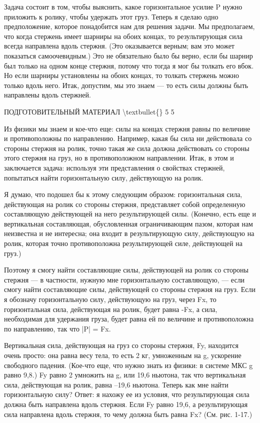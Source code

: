 \documentclass[10pt,oneside]{article}
\begin{document}
Задача состоит в том, чтобы выяснить, какое горизонтальное усилие P нужно приложить к ролику, чтобы удержать этот груз. Теперь я сделаю одно предположение, которое понадобится нам для решения задачи. Мы предполагаем, что когда стержень имеет шарниры на обоих концах, то результирующая сила всегда направлена вдоль стержня. (Это оказывается верным; вам это может показаться самоочевидным.) Это не обязательно было бы верно, если бы шарнир был только на одном конце стержня, потому что тогда я мог бы толкать его вбок. Но если шарниры установлены на обоих концах, то толкать стержень можно только вдоль него. Итак, допустим, мы это знаем --- то есть силы должны быть направлены вдоль стержней.\par

ПОДГОТОВИТЕЛЬНЫЙ МАТЕРИАЛ \textbackslash{}textbullet\{\} 5 5\par

Из физики мы знаем и кое-что еще: силы на концах стержня равны по величине и противоположны по направлению. Например, какая бы сила ни действовала со стороны стержня на ролик, точно такая же сила должна действовать со стороны этого стержня на груз, но в противоположном направлении. Итак, в этом и заключается задача: используя эти представления о свойствах стержней, попытаться найти горизонтальную силу, действующую на ролик.\par

Я думаю, что подошел бы к этому следующим образом: горизонтальная сила, действующая на ролик со стороны стержня, представляет собой определенную составляющую действующей на него результирующей силы. (Конечно, есть еще и вертикальная составляющая, обусловленная ограничивающим пазом, которая нам неизвестна и не интересна; она входит в результирующую силу, действующую на ролик, которая точно противоположна результирующей силе, действующей на груз.)\par

Поэтому я смогу найти составляющие силы, действующей на ролик со стороны стержня --- в частности, нужную мне горизонтальную составляющую, --- если смогу найти составляющие силы, действующей со стороны стержня на груз. Если я обозначу горизонтальную силу, действующую на груз, через Fx, то горизонтальная сила, действующая на ролик, будет равна -Fx, а сила, необходимая для удержания груза, будет равна ей по величине и противоположна по направлению, так что |P| = Fx.\par

Вертикальная сила, действующая на груз со стороны стержня, Fy, находится очень просто: она равна весу тела, то есть 2 кг, умноженным на g, ускорение свободного падения. (Кое-что еще, что нужно знать из физики: в системе МКС g равно 9,8.) Fy равно 2 умножить на g, или 19,6 ньютона, так что вертикальная сила, действующая на ролик, равна –19,6 ньютона. Теперь как мне найти горизонтальную силу? Ответ: я нахожу ее из условия, что результирующая сила должна быть направлена вдоль стержня. Если Fy равно 19,6, а результирующая сила направлена вдоль стержня, то чему должна быть равна Fx? (См. рис. 1-17.)\par
\end{document}
